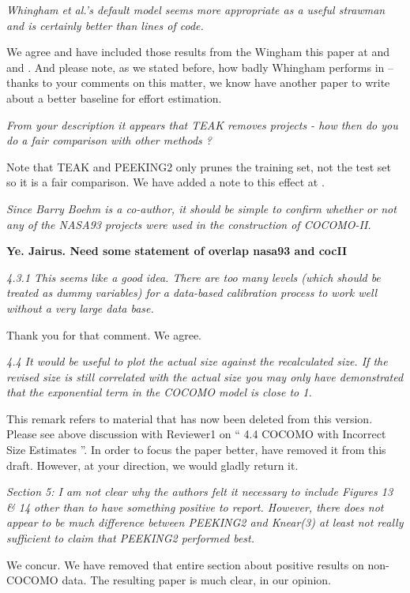 \documentclass[smallcondesed]{svjour3}
\begin{document}
{\em Whingham et al.'s default model seems more
  appropriate as a useful strawman and is certainly
  better than lines of code.}

 We agree and 
have included those results from the Wingham this paper at
 and  and . And please note, as we stated
before, how badly
Whingham performs in -- thanks to your comments on this matter, we know have
another paper to write about a better baseline for effort estimation.


{\em From your description it appears that TEAK
  removes projects - how then do you do a fair
  comparison with other methods ? }

Note that TEAK and PEEKING2 only prunes the training set, not the test set so it is a fair comparison.
We have added a note to this effect at .

{\em Since Barry Boehm is a co-author, it should be simple to confirm whether or not any of the NASA93 projects were used in the construction of COCOMO-II.}

{\bf Ye. Jairus. Need some statement of overlap nasa93 and cocII}


{\em  4.3.1 This seems like a good idea. There are too many levels (which should be treated as dummy variables) for a data-based calibration process to work well without a very large data base.}

Thank you for that comment. We agree.

{\em 4.4 It would be useful to plot the actual size against the recalculated size. If the revised size is still correlated with the actual size you may only have demonstrated that the exponential term in the COCOMO model is close to 1.}

This remark refers to material that has now been deleted from this version.
Please see above discussion with Reviewer1 on `` 4.4 COCOMO with Incorrect Size Estimates ''.
In order to focus the paper better,  have removed it from this draft. However, at your direction, we would gladly return it.


{\em Section 5: I am not clear why the authors felt it necessary to include Figures 13 \& 14 other than to have something positive to report. However, there does not appear to be much difference between PEEKING2 and Knear(3) at least not really sufficient to claim that PEEKING2 performed best.}

We concur. We have removed that entire section about positive results on non-COCOMO data.
The resulting paper is much clear, in our opinion.
\end{document}
